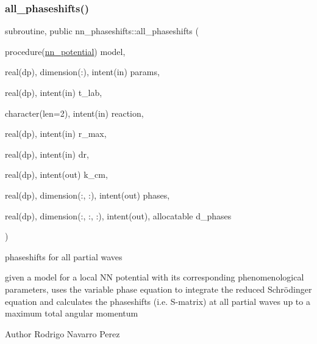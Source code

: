 \subsubsection{\texorpdfstring{all\+\_\+phaseshifts()}{all\_phaseshifts()}}
{\footnotesize\ttfamily subroutine, public nn\+\_\+phaseshifts\+::all\+\_\+phaseshifts (\begin{DoxyParamCaption}\item[{procedure(\hyperlink{interfacenn__phaseshifts_1_1nn__potential}{nn\+\_\+potential})}]{model,  }\item[{real(dp), dimension(\+:), intent(in)}]{params,  }\item[{real(dp), intent(in)}]{t\+\_\+lab,  }\item[{character(len=2), intent(in)}]{reaction,  }\item[{real(dp), intent(in)}]{r\+\_\+max,  }\item[{real(dp), intent(in)}]{dr,  }\item[{real(dp), intent(out)}]{k\+\_\+cm,  }\item[{real(dp), dimension(\+:, \+:), intent(out)}]{phases,  }\item[{real(dp), dimension(\+:, \+:, \+:), intent(out), allocatable}]{d\+\_\+phases }\end{DoxyParamCaption})}



phaseshifts for all partial waves 

given a model for a local NN potential with its corresponding phenomenological parameters, uses the variable phase equation to integrate the reduced Schrödinger equation and calculates the phaseshifts (i.\+e. S-\/matrix) at all partial waves up to a maximum total angular momentum

\begin{DoxyAuthor}{Author}
Rodrigo Navarro Perez
\end{DoxyAuthor}

